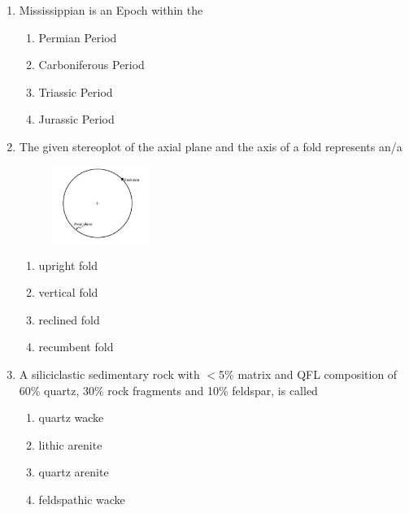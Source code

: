 \documentclass[journal,12pt,onecolumn]{IEEEtran}
\begin{document}
\begin{enumerate}
\item Mississippian is an Epoch within the

\hfill{}
\begin{multicols}{2}
\begin{enumerate}
    \item Permian Period
    \item Carboniferous Period
    \item Triassic Period
    \item Jurassic Period
\end{enumerate}
\end{multicols}

\item The given stereoplot of the axial plane and the axis of a fold represents an/a

\hfill{}
\begin{figure}[h!]
    \centering
    \includegraphics[width=0.3\textwidth]{figs/fig3.png}
    \caption{}
    \label{fig:partA_q6}
\end{figure}
\begin{multicols}{2}
\begin{enumerate}
    \item upright fold
    \item vertical fold
    \item reclined fold
    \item recumbent fold
\end{enumerate}
\end{multicols}

\item A siliciclastic sedimentary rock with $<$5\% matrix and QFL composition of 60\% quartz, 30\% rock fragments and 10\% feldspar, is called

\hfill{}
\begin{multicols}{2}
\begin{enumerate}
    \item quartz wacke
    \item lithic arenite
    \item quartz arenite
    \item feldspathic wacke
\end{enumerate}
\end{multicols}


\end{enumerate}
\end{document}
